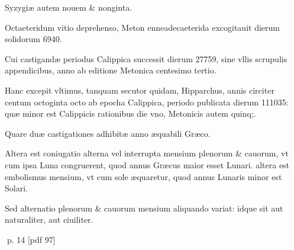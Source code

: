 \begin{parnumbers}
Syzygiæ autem nouem \& nonginta.

Octaeteridum vitio deprehenso, Meton enneadecaeterida excogitauit dierum solidorum 6940.

Cui castigandæ periodus Calippica successit dierum 27759, sine vllis scrupulis appendicibus, anno ab editione Metonica centesimo tertio.

Hanc excepit vltimus, tanquam secutor quidam,  Hipparchus, annis circiter centum octoginta octo ab epocha Calippica, periodo publicata dierum 111035: quæ minor est Calippicis rationibus die vno, Metonicis autem quinq;.

Quare duæ castigationes adhibitæ anno æquabili Græco.

Altera est coniugatio alterna vel interrupta mensium plenorum \& cauorum, vt cum ipsa Luna congruerent, quod annus Græcus maior esset Lunari. altera est embolismus mensium, vt cum sole æquaretur, quod annus Lunaris minor est Solari.

Sed alternatio plenorum \& cauorum mensium aliquando variat: idque sit aut naturaliter, aut ciuiliter.

\end{parnumbers}
\clearpage
p. 14 [pdf 97]

